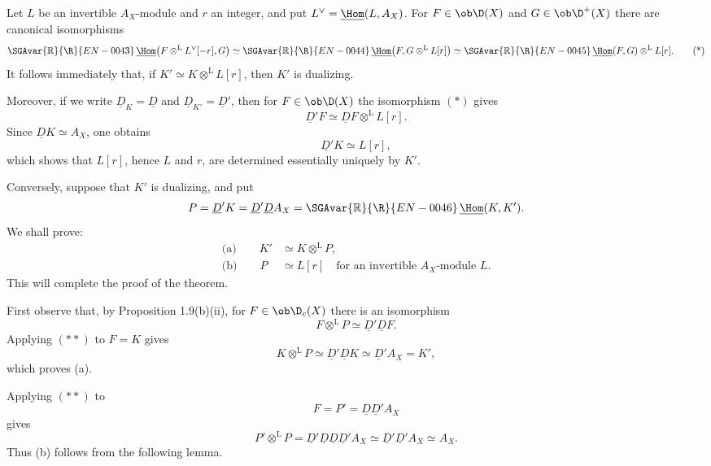 \begin{prooftext}
Let $L$ be an invertible $A_X$-module and $r$ an integer, and put $L^\vee=\underline{\Hom}(L,A_X)$. For $F\in\ob\D(X)$ and $G\in\ob\D^+(X)$ there are canonical isomorphisms
\begin{equation}
\SGAvar{\mathbb{R}}{\R}{EN-0043}\,\underline{\Hom}\bigl(F\otimes^{\mathrm L}L^\vee[-r],G\bigr)
   \simeq
\SGAvar{\mathbb{R}}{\R}{EN-0044}\,\underline{\Hom}\bigl(F,G\otimes^{\mathrm L}L[r]\bigr)
   \simeq
\SGAvar{\mathbb{R}}{\R}{EN-0045}\,\underline{\Hom}(F,G)\otimes^{\mathrm L}L[r]. \tag{*}
\end{equation}
It follows immediately that, if $K'\simeq K\otimes^{\mathrm L}L[r]$, then $K'$ is dualizing.

Moreover, if we write $\underline D_K=\underline D$ and $\underline D_{K'}=\underline D'$, then for $F\in\ob\D(X)$ the isomorphism $(*)$ gives
\[
   \underline D'F\simeq\underline DF\otimes^{\mathrm L}L[r].
\]
Since $\underline DK\simeq A_X$, one obtains
\[
   \underline D'K\simeq L[r],
\]
which shows that $L[r]$, hence $L$ and $r$, are determined essentially uniquely by $K'$.

Conversely, suppose that $K'$ is dualizing, and put
\[
   P=\underline D'K=\underline D'\underline DA_X=\SGAvar{\mathbb{R}}{\R}{EN-0046}\,\underline{\Hom}(K,K').
\]
We shall prove:
\begin{align*}
\text{(a)}\qquad K'&\simeq K\otimes^{\mathrm L}P,\\
\text{(b)}\qquad P&\simeq L[r]\quad\text{for an invertible }A_X\text{-module }L.
\end{align*}
This will complete the proof of the theorem.

First observe that, by Proposition 1.9(b)(ii), for $F\in\ob\D_c(X)$ there is an isomorphism
\begin{equation}
F\otimes^{\mathrm L}P\simeq\underline D'\underline DF. \tag{**}
\end{equation}
Applying $(**)$ to $F=K$ gives
\[
   K\otimes^{\mathrm L}P\simeq\underline D'\underline DK\simeq\underline D'A_X=K',
\]
which proves (a).

Applying $(**)$ to
\[
   F=P'=\underline D\underline D'A_X
\]
gives
\[
   P'\otimes^{\mathrm L}P
      =\underline D'\underline D\underline D\underline D'A_X
      \simeq\underline D'\underline D'A_X
      \simeq A_X.
\]
Thus (b) follows from the following lemma. \qedtext
\end{prooftext}

